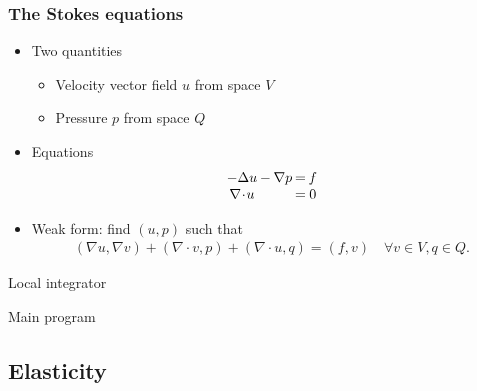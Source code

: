 \begin{frame}
  \frametitle{The Stokes equations}
  \begin{itemize}
  \item Two quantities
    \begin{itemize}
    \item Velocity vector field $u$ from space $V$
    \item Pressure $p$ from space $Q$
    \end{itemize}
  \item Equations
    \begin{gather*}
      \arraycolsep1pt
      \begin{matrix}
        -\Delta u &-& \nabla p &=& f \\
        \nabla \!\cdot\! u &&&=&0
      \end{matrix}
    \end{gather*}
  \item Weak form: find $(u,p)$ such that
    \begin{gather*}
      (\nabla u, \nabla v) + (\nabla \!\cdot\! v,p)
      + (\nabla \!\cdot\! u,q) = (f,v)
      \quad
      \forall v\in V, q\in Q.
    \end{gather*}
  \end{itemize}
\end{frame}

\begin{frame}
  \begin{block}{Local integrator}
    
  \end{block}
\end{frame}

\begin{frame}
  \begin{block}{Main program}
    
  \end{block}
\end{frame}

\subsection{Elasticity}
\frame{\tableofcontents[currentsection,subsectionstyle=show/shaded/hide]}

